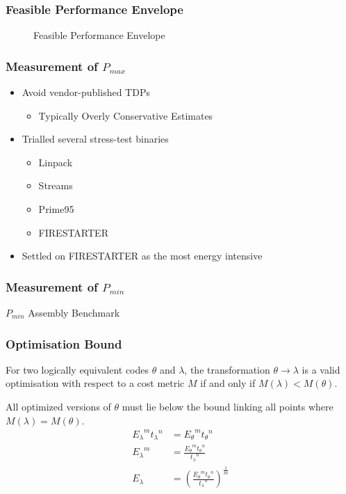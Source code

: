 \documentclass{beamer}
\begin{document}
  \begin{frame}
    \frametitle{Feasible Performance Envelope}
    \begin{figure}
    \centering
    
    \caption{Feasible Performance Envelope}
    \end{figure}
  \end{frame}

  \begin{frame}
    \frametitle{Measurement of $P_{max}$}
    \begin{itemize}
      \item Avoid vendor-published TDPs
      \begin{itemize}
        \item Typically Overly Conservative Estimates
      \end{itemize}
      \item Trialled several stress-test binaries
      \begin{itemize}
        \item Linpack
        \item Streams
        \item Prime95
        \item FIRESTARTER
      \end{itemize}
      \item Settled on FIRESTARTER as the most energy intensive
    \end{itemize}
  \end{frame}

  \begin{frame}
    \frametitle{Measurement of $P_{min}$}
    \begin{block}{$P_{min}$ Assembly Benchmark}
      
    \end{block}
  \end{frame}




  \begin{frame}
    \frametitle{Optimisation Bound}
    \begin{definition}
    For two logically equivalent codes $\theta$ and $\lambda$, the transformation ${\theta \to \lambda}$ is a valid optimisation with respect to a cost metric $M$ if and only if ${M(\lambda) < M(\theta)}$. 
    \end{definition}
All optimized versions of $\theta$ must lie below the bound linking all points where ${M(\lambda) = M(\theta)}$.
\begin{align}
 {E_\lambda}^m{t_\lambda}^n &= {E_\theta}^m{t_\theta}^n \nonumber \\
 {E_\lambda}^m &= \frac{{E_\theta}^m{t_\theta}^n}{{t_\lambda}^n} \nonumber \\
  E_\lambda &= (\frac{{E_\theta}^m{t_\theta}^n}{{t_\lambda}^n})^\frac{1}{m}
\end{align}
  \end{frame}
\end{document}

